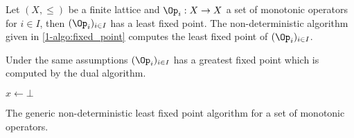 \begin{theorem}
\label{1-thm:kleene_set_operators}
Let $(X,\le)$ be a finite lattice and $\Op_i : X \to X$ a set of monotonic operators for $i \in I$, then $(\Op_i)_{i \in I}$ has a least fixed point.
The non-deterministic algorithm given in \cref{1-algo:fixed_point} computes the least fixed point of $(\Op_i)_{i \in I}$.
\end{theorem}

Under the same assumptions $(\Op_i)_{i \in I}$ has a greatest fixed point which is computed by the dual algorithm.

\begin{algorithm}

$x \leftarrow \bot$ 


\caption{The generic non-deterministic least fixed point algorithm for a set of monotonic operators.}
\label{1-algo:fixed_point}
\end{algorithm}

